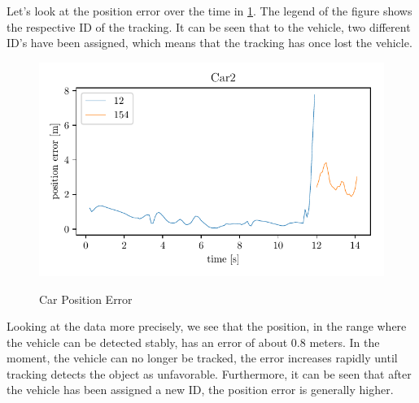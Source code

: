 \documentclass[11pt,oneside,openright]{mpreport}
\begin{document}
Let's look at the position error over the time in \cref{car_pos_err}. The legend of the figure shows the respective ID of the tracking. 
It can be seen that to the vehicle, two different ID's have been assigned, which means that the tracking has once lost the vehicle.

\begin{figure}[!htb]
  \caption{Car Position Error} 
  \centering
  \includegraphics[width=\textwidth]{bilder/Car2_pos_err.pdf}
 \label{car_pos_err}
\end{figure}
Looking at the data more precisely, we see that the position, in the range where the vehicle can be detected stably, has an error of about 0.8 meters. 
In the moment, the vehicle can no longer be tracked, the error increases rapidly until tracking detects the object as unfavorable. 
Furthermore, it can be seen that after the vehicle has been assigned a new ID, the position error is generally higher.

\end{document}
